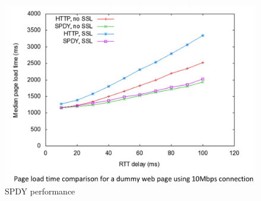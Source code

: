 \documentclass[a4paper,11pt]{article}
\begin{document}
\begin{figure}[H]
    \centering
    \includegraphics[width=\textwidth]{./images/spdyperformance.png}
    \caption{SPDY performance}
\end{figure}
\end{document}
